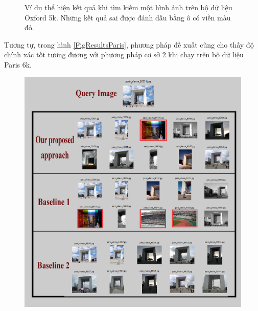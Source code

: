 \begin{figure}[!htbp]
\begin{center}
    \fi
    \caption[Ví dụ thể hiện kết quả khi tìm kiếm một hình ảnh trên bộ dữ liệu Oxford 5k]{Ví dụ thể hiện kết quả khi tìm kiếm một hình ảnh trên bộ dữ liệu Oxford 5k. Những kết quả sai được đánh dấu bằng ô có viền màu đỏ.}
    \label{FigResultsOxf}
  \end{center}
\end{figure}

Tương tự, trong hình \ref{FigResultsParis}, phương pháp đề xuất cũng cho thấy độ chính xác tốt tương đương với phương pháp cơ sở 2 khi chạy trên bộ dữ liệu Paris 6k.


\begin{figure}[!htbp]
  \begin{center}
    \leavevmode
    \ifpdf
      \includegraphics[scale=0.2]{resParis6k}
    \else

\end{center}
\end{figure}
